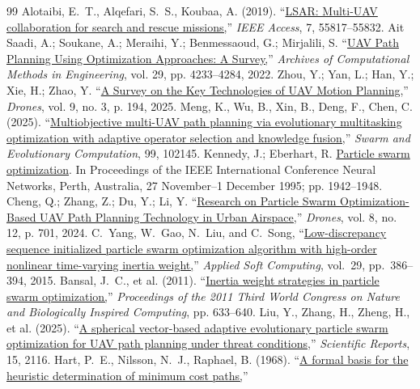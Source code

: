 \documentclass[final,5p,times]{elsarticle}
\begin{document}
\begin{table}[t]
{\begin{thebibliography}{99}
Alotaibi, E.~T., Alqefari, S.~S., Koubaa, A.
(2019).
``\href{https://doi.org/10.1109/access.2019.2912306}{LSAR: Multi-UAV collaboration for search and rescue missions,}''
\textit{IEEE Access}, 7, 55817--55832. 
Ait Saadi, A.; Soukane, A.; Meraihi, Y.; Benmessaoud, G.; Mirjalili, S.
``\href{https://doi.org/10.1007/s11831-022-09742-7}{UAV Path Planning Using Optimization Approaches: A Survey,}'' \textit{Archives of Computational Methods in Engineering}, vol. 29, pp. 4233--4284, 2022. 
Zhou, Y.; Yan, L.; Han, Y.; Xie, H.; Zhao, Y.
``\href{https://doi.org/10.3390/drones9030194}{A Survey on the Key Technologies of UAV Motion Planning,}'' \textit{Drones}, vol. 9, no. 3, p. 194, 2025. 
Meng, K., Wu, B., Xin, B., Deng, F., Chen, C.
(2025).
``\href{https://doi.org/10.1016/j.swevo.2025.102145}{Multiobjective multi-UAV path planning via evolutionary multitasking optimization with adaptive operator selection and knowledge fusion,}''
\textit{Swarm and Evolutionary Computation}, 99, 102145. 
Kennedy, J.; Eberhart, R. \href{https://doi.org/10.1109/ICNN.1995.488968}{Particle swarm optimization}. In Proceedings of the IEEE International Conference Neural Networks, Perth, Australia, 27 November--1 December 1995; pp. 1942--1948. 
Cheng, Q.; Zhang, Z.; Du, Y.; Li, Y.
``\href{https://doi.org/10.3390/drones8120701}{Research on Particle Swarm Optimization-Based UAV Path Planning Technology in Urban Airspace,}''
\textit{Drones}, vol. 8, no. 12, p. 701, 2024. 
C.~Yang, W.~Gao, N.~Liu, and C.~Song,
``\href{https://doi.org/10.1016/j.asoc.2015.01.004}{Low-discrepancy sequence initialized particle swarm optimization algorithm with high-order nonlinear time-varying inertia weight,}''
\textit{Applied Soft Computing}, vol.~29, pp.~386--394, 2015. 
Bansal, J.~C., et al. (2011).
``\href{https://doi.org/10.1109/nabic.2011.6089659}{Inertia weight strategies in particle swarm optimization,}''
\textit{Proceedings of the 2011 Third World Congress on Nature and Biologically Inspired Computing}, pp. 633--640. 
Liu, Y., Zhang, H., Zheng, H., et al. (2025).
``\href{https://doi.org/10.1038/s41598-025-85912-4}{A spherical vector-based adaptive evolutionary particle swarm optimization for UAV path planning under threat conditions,}''
\textit{Scientific Reports}, 15, 2116. 
Hart, P.~E., Nilsson, N.~J., Raphael, B.
(1968).
``\href{https://doi.org/10.1109/tssc.1968.300136}{A formal basis for the heuristic determination of minimum cost paths,}''

\end{thebibliography}}
\end{table}
\end{document}
